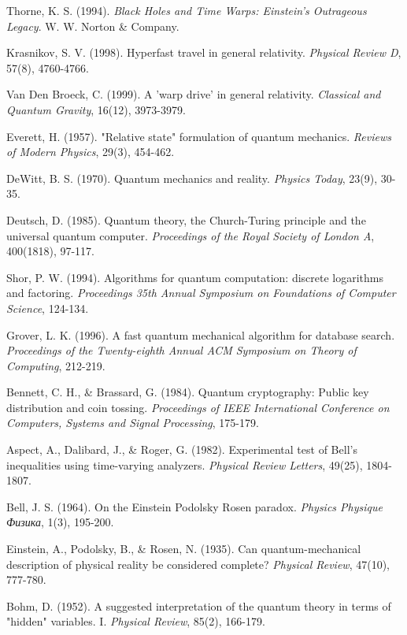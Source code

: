 \documentclass[12pt,a4paper]{article}
\begin{document}
\begin{thebibliography}{99}
Thorne, K. S. (1994). \textit{Black Holes and Time Warps: Einstein's Outrageous Legacy}. W. W. Norton \& Company.

Krasnikov, S. V. (1998). Hyperfast travel in general relativity. \textit{Physical Review D}, 57(8), 4760-4766.

Van Den Broeck, C. (1999). A 'warp drive' in general relativity. \textit{Classical and Quantum Gravity}, 16(12), 3973-3979.

Everett, H. (1957). "Relative state" formulation of quantum mechanics. \textit{Reviews of Modern Physics}, 29(3), 454-462.

DeWitt, B. S. (1970). Quantum mechanics and reality. \textit{Physics Today}, 23(9), 30-35.

Deutsch, D. (1985). Quantum theory, the Church-Turing principle and the universal quantum computer. \textit{Proceedings of the Royal Society of London A}, 400(1818), 97-117.

Shor, P. W. (1994). Algorithms for quantum computation: discrete logarithms and factoring. \textit{Proceedings 35th Annual Symposium on Foundations of Computer Science}, 124-134.

Grover, L. K. (1996). A fast quantum mechanical algorithm for database search. \textit{Proceedings of the Twenty-eighth Annual ACM Symposium on Theory of Computing}, 212-219.

Bennett, C. H., \& Brassard, G. (1984). Quantum cryptography: Public key distribution and coin tossing. \textit{Proceedings of IEEE International Conference on Computers, Systems and Signal Processing}, 175-179.

Aspect, A., Dalibard, J., \& Roger, G. (1982). Experimental test of Bell's inequalities using time-varying analyzers. \textit{Physical Review Letters}, 49(25), 1804-1807.

Bell, J. S. (1964). On the Einstein Podolsky Rosen paradox. \textit{Physics Physique Физика}, 1(3), 195-200.

Einstein, A., Podolsky, B., \& Rosen, N. (1935). Can quantum-mechanical description of physical reality be considered complete? \textit{Physical Review}, 47(10), 777-780.

Bohm, D. (1952). A suggested interpretation of the quantum theory in terms of "hidden" variables. I. \textit{Physical Review}, 85(2), 166-179.


\end{thebibliography}
\end{document}
